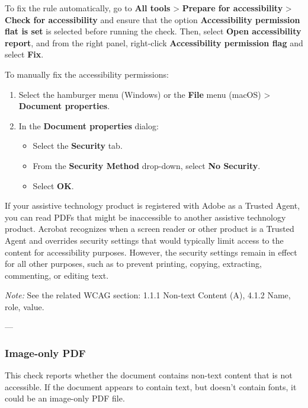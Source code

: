 To fix the rule automatically, go to \textbf{All tools} > \textbf{Prepare for accessibility} > \textbf{Check for accessibility} and ensure that the option \textbf{Accessibility permission flat is set} is selected before running the check. Then, select \textbf{Open accessibility report}, and from the right panel, right-click \textbf{Accessibility permission flag} and select \textbf{Fix}.

To manually fix the accessibility permissions:
\begin{enumerate}
    \item Select the hamburger menu (Windows) or the \textbf{File} menu (macOS) > \textbf{Document properties}.
    \item In the \textbf{Document properties} dialog:
    \begin{itemize}
        \item Select the \textbf{Security} tab.
        \item From the \textbf{Security Method} drop-down, select \textbf{No Security}.
        \item Select \textbf{OK}.
    \end{itemize}
\end{enumerate}
If your assistive technology product is registered with Adobe as a Trusted Agent, you can read PDFs that might be inaccessible to another assistive technology product. Acrobat recognizes when a screen reader or other product is a Trusted Agent and overrides security settings that would typically limit access to the content for accessibility purposes. However, the security settings remain in effect for all other purposes, such as to prevent printing, copying, extracting, commenting, or editing text\footnotemark[1].

\vspace{0.5em}
\noindent\textit{Note:} See the related WCAG section: 1.1.1 Non-text Content (A), 4.1.2 Name, role, value\footnotemark[1].

---

\subsubsection*{Image-only PDF}
This check reports whether the document contains non-text content that is not accessible. If the document appears to contain text, but doesn't contain fonts, it could be an image-only PDF file\footnotemark[1].


